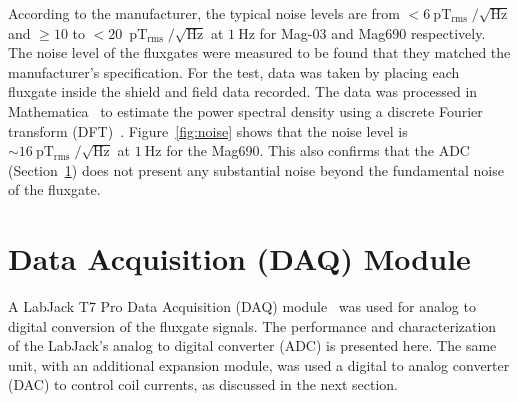 

According to the manufacturer, the typical noise levels are from $\mathrm{<6~pT_{rms}\;/\sqrt{Hz}}$ and $\geq \mathrm{10}$ to $\mathrm{<20}$~$\mathrm{pT_{rms}\;/\sqrt{Hz}}$ at $\mathrm{1~Hz}$ for Mag-03 and Mag690 respectively. The noise level of the fluxgates were measured to be found that they matched the manufacturer's specification. For the test, data was taken by placing each fluxgate inside the shield and field data recorded. The data was processed in Mathematica~\cite{Mathematica} to estimate the power spectral density using a discrete Fourier transform (DFT)~\cite{dft}. Figure~\ref{fig:noise} shows that the noise level is $\sim\mathrm{16~pT_{rms}\;/\sqrt{Hz}}$ at $\mathrm{1~Hz}$ for the Mag690. This also confirms that the ADC (Section~\ref{sec:DAQ}) does not present any substantial noise beyond the fundamental noise of the fluxgate.






\section{Data Acquisition (DAQ) Module}\label{sec:DAQ}


A LabJack T7 Pro Data Acquisition (DAQ) module~\cite{T7} was used for analog to digital conversion of the 
fluxgate signals. The performance and characterization of the LabJack's analog to digital converter (ADC) is presented here. The same unit, with an additional expansion module, was used a digital to analog converter (DAC) to control coil currents, as discussed in the next section.

